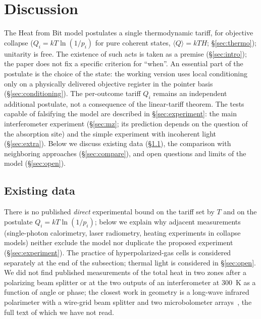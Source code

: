 \documentclass[11pt,a4paper]{article}
\newcommand{\Sref}[1]{\hyperref[#1]{\S\ref{#1}}}
\begin{document}
\section{Discussion}\label{sec:discussion}

The Heat from Bit model postulates a single thermodynamic tariff, for objective collapse ($Q_i = kT\ln(1/p_i)$ for pure coherent states, $\langle Q\rangle = kT H$; \Sref{sec:thermo}); unitarity is free. The existence of such acts is taken as a premise (\Sref{sec:intro}); the paper does not fix a specific criterion for ``when''. An essential part of the postulate is the choice of the state: the working version uses local conditioning only on a physically delivered objective register in the pointer basis (\Sref{sec:conditioning}). The per-outcome tariff $Q_i$ remains an independent additional postulate, not a consequence of the linear-tariff theorem. The tests capable of falsifying the model are described in \Sref{sec:experiment}: the main interferometer experiment (\Sref{sec:mz}; its prediction depends on the question of the absorption site) and the simple experiment with incoherent light (\Sref{sec:extra}). Below we discuss existing data (\Sref{sec:data}), the comparison with neighboring approaches (\Sref{sec:compare}), and open questions and limits of the model (\Sref{sec:open}).

\subsection{Existing data}\label{sec:data}

There is no published \emph{direct} experimental bound on the tariff set by $T$ and on the postulate $Q_i=kT\ln(1/p_i)$; below we explain why adjacent measurements (single-photon calorimetry, laser radiometry, heating experiments in collapse models) neither exclude the model nor duplicate the proposed experiment (\Sref{sec:experiment}). The practice of hyperpolarized-gas cells is considered separately at the end of the subsection; thermal light is considered in \Sref{sec:open}. We did not find published measurements of the total heat in two zones after a polarizing beam splitter or at the two outputs of an interferometer at 300~K as a function of angle or phase; the closest work in geometry is a long-wave infrared polarimeter with a wire-grid beam splitter and two microbolometer arrays~\cite{kudenov2009}, the full text of which we have not read.
\end{document}
